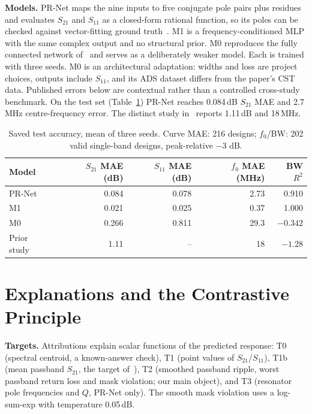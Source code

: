 \documentclass[conference,10pt]{IEEEtran}
\begin{document}
\textbf{Models.}
PR-Net maps the nine inputs to five conjugate pole pairs plus residues and evaluates $S_{21}$ and $S_{11}$ as a closed-form rational function, so its poles can be checked against vector-fitting ground truth~\cite{gustavsen1999}.
M1 is a frequency-conditioned MLP with the same complex output and no structural prior.
M0 reproduces the fully connected network of~\cite{suslova2026} and serves as a deliberately weaker model.
Each is trained with three seeds. M0 is an architectural adaptation: widths and loss are project choices, outputs include $S_{11}$, and its ADS dataset differs from the paper's CST data. Published errors below are contextual rather than a controlled cross-study benchmark.
On the test set (Table~\ref{tab:acc}) PR-Net reaches 0.084\,dB $S_{21}$ MAE and 2.7\,MHz centre-frequency error. The distinct study in~\cite{suslova2026} reports 1.11\,dB and 18\,MHz.

\begin{table}[!t]
\centering
\caption{Saved test accuracy, mean of three seeds. Curve MAE: 216 designs; $f_0$/BW: 202 valid single-band designs, peak-relative $-3$ dB.}
\label{tab:acc}
\small
\begin{tabular}{lrrrr}
\toprule
Model & \shortstack{$S_{21}$ MAE\\(dB)} & \shortstack{$S_{11}$ MAE\\(dB)} & \shortstack{$f_0$ MAE\\(MHz)} & BW $R^2$ \\
\midrule
PR-Net & 0.084 & 0.078 & 2.73 & 0.910 \\
M1 & 0.021 & 0.025 & 0.37 & 1.000 \\
M0 & 0.266 & 0.811 & 29.3 & $-0.342$ \\
Prior study~\cite{suslova2026} & 1.11 & -- & 18 & $-1.28$ \\
\bottomrule
\end{tabular}
\end{table}

\section{Explanations and the Contrastive Principle}
\textbf{Targets.} Attributions explain scalar functions of the predicted response:
T0 (spectral centroid, a known-answer check), T1 (point values of $S_{21}$/$S_{11}$),
T1b (mean passband $S_{21}$, the target of~\cite{suslova2026}),
T2 (smoothed passband ripple, worst passband return loss and mask violation; our main object), and T3 (resonator pole frequencies and $Q$, PR-Net only).
The smooth mask violation uses a log-sum-exp with temperature 0.05\,dB.
\end{document}
